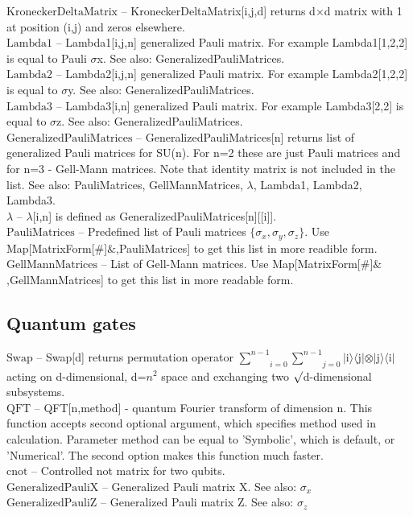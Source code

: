 \noindent\textbf{$ \text{KroneckerDeltaMatrix} $ }-- KroneckerDeltaMatrix[i,j,d] returns d$\times $d matrix with 1 at position (i,j) and zeros elsewhere.$  $\\
\noindent\textbf{$ \text{Lambda1} $ }-- Lambda1[i,j,n] generalized Pauli matrix. For example Lambda1[1,2,2] is equal to Pauli $\sigma $x. See also: GeneralizedPauliMatrices.$  $\\
\noindent\textbf{$ \text{Lambda2} $ }-- Lambda2[i,j,n] generalized Pauli matrix. For example Lambda2[1,2,2] is equal to $\sigma $y. See also: GeneralizedPauliMatrices.$  $\\
\noindent\textbf{$ \text{Lambda3} $ }-- Lambda3[i,n] generalized Pauli matrix. For example Lambda3[2,2] is equal to $\sigma $z. See also: GeneralizedPauliMatrices.$  $\\
\noindent\textbf{$ \text{GeneralizedPauliMatrices} $ }-- GeneralizedPauliMatrices[n] returns list of generalized Pauli matrices for SU(n). For n=2 these are just Pauli matrices and for n=3 - Gell-Mann matrices. Note that identity matrix is not included in the list. See also: PauliMatrices, GellMannMatrices, $\lambda $, Lambda1, Lambda2, Lambda3.$  $\\
\noindent\textbf{$ \lambda  $ }-- $\lambda $[i,n] is defined as GeneralizedPauliMatrices[n][[i]].$  $\\
\noindent\textbf{$ \text{PauliMatrices} $ }-- Predefined list of Pauli matrices $\{$$ \sigma _x,\sigma _y,\sigma _z $$\}$. Use Map[MatrixForm[$\#$]$\&$,PauliMatrices] to get this list in more readible form.$  $\\
\noindent\textbf{$ \text{GellMannMatrices} $ }-- List of Gell-Mann matrices. Use Map[MatrixForm[$\#$]$\&$,GellMannMatrices] to get this list in more readable form.$  $\\
\subsection{Quantum gates}

\noindent\textbf{$ \text{Swap} $ }-- Swap[d] returns permutation operator $ \underset{i=0}{\overset{n-1}{ \sum }}\underset{j=0}{\overset{n-1}{ \sum }} $$|$i$\rangle \langle $j$|\otimes |$j$\rangle \langle $i$|$ acting on d-dimensional, d=$ n^2 $ space and exchanging two $\surd $d-dimensional subsystems.$  $\\
\noindent\textbf{$ \text{QFT} $ }-- QFT[n,method] - quantum Fourier transform of dimension n. This function accepts second optional argument, which specifies method used in calculation. Parameter method can be equal to 'Symbolic', which is default, or 'Numerical'. The second option makes this function much faster.$  $\\
\noindent\textbf{$ \text{cnot} $ }-- Controlled not matrix for two qubits.$  $\\
\noindent\textbf{$ \text{GeneralizedPauliX} $ }-- Generalized Pauli matrix X. See also: $ \sigma _x $\\
\noindent\textbf{$ \text{GeneralizedPauliZ} $ }-- Generalized Pauli matrix Z. See also: $ \sigma _z $\\
